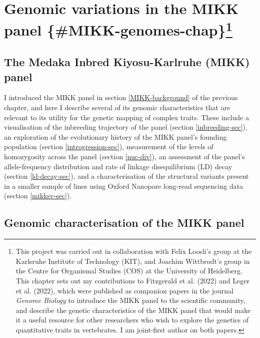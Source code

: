 \documentclass[
]{book}
\begin{document}
\hypertarget{genomic-variations-in-the-mikk-panel-mikk-genomes-chap}{%
\chapter[Genomic variations in the MIKK panel \{\#MIKK-genomes-chap\}]{\texorpdfstring{Genomic variations in the MIKK panel \{\#MIKK-genomes-chap\}\footnote{This project was carried out in collaboration with Felix Loosli's group at the Karlsruhe Institute of Technology (KIT), and Joachim Wittbrodt's group in the Centre for Organismal Studies (COS) at the University of Heidelberg. This chapter sets out my contributions to Fitzgerald et al. (2022) and Leger et al. (2022), which were published as companion papers in the journal \emph{Genome Biology} to introduce the MIKK panel to the scientific community, and describe the genetic characteristics of the MIKK panel that would make it a useful resource for other researchers who wish to explore the genetics of quantitative traits in vertebrates. I am joint-first author on both papers.}}{Genomic variations in the MIKK panel \{\#MIKK-genomes-chap\}}}\label{genomic-variations-in-the-mikk-panel-mikk-genomes-chap}}

\hypertarget{the-medaka-inbred-kiyosu-karlruhe-mikk-panel}{%
\section{The Medaka Inbred Kiyosu-Karlruhe (MIKK) panel}\label{the-medaka-inbred-kiyosu-karlruhe-mikk-panel}}

I introduced the MIKK panel in section \ref{MIKK-background} of the previous chapter, and here I describe several of its genomic characteristics that are relevant to its utility for the genetic mapping of complex traits. These include a visualisation of the inbreeding trajectory of the panel (section \ref{inbreeding-sec}), an exploration of the evolutionary history of the MIKK panel's founding population (section \ref{introgression-sec}), measurement of the levels of homozygosity across the panel (section \ref{nuc-div}), an assessment of the panel's allele-frequency distribution and rate of linkage disequilibrium (LD) decay (section \ref{ld-decay-sec}), and a characterisation of the structural variants present in a smaller sample of lines using Oxford Nanopore long-read sequencing data (section \ref{mikksv-sec}).

\hypertarget{genomic-characterisation-of-the-mikk-panel}{%
\section{Genomic characterisation of the MIKK panel}\label{genomic-characterisation-of-the-mikk-panel}}
\end{document}
